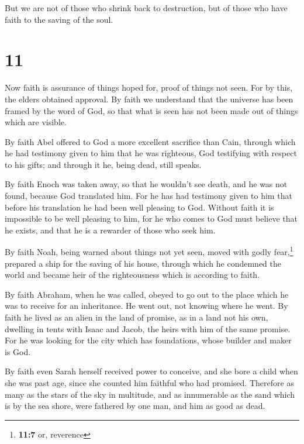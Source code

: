  But we are not of those who shrink back to destruction,
but of those who have faith to the saving of the soul.

\hypertarget{section-10}{%
\section{11}\label{section-10}}

 Now faith is assurance of things hoped for, proof of
things not seen.  For by this, the elders obtained
approval.  By faith we understand that the universe has
been framed by the word of God, so that what is seen has not been made
out of things which are visible.

 By faith Abel offered to God a more excellent sacrifice
than Cain, through which he had testimony given to him that he was
righteous, God testifying with respect to his gifts; and through it he,
being dead, still speaks.

 By faith Enoch was taken away, so that he wouldn't see
death, and he was not found, because God translated him. For he has had
testimony given to him that before his translation he had been well
pleasing to God.  Without faith it is impossible to be
well pleasing to him, for he who comes to God must believe that he
exists, and that he is a rewarder of those who seek him.

 By faith Noah, being warned about things not yet seen,
moved with godly fear,\footnote{\textbf{11:7} or, reverence} prepared a
ship for the saving of his house, through which he condemned the world
and became heir of the righteousness which is according to faith.

 By faith Abraham, when he was called, obeyed to go out to
the place which he was to receive for an inheritance. He went out, not
knowing where he went.  By faith he lived as an alien in
the land of promise, as in a land not his own, dwelling in tents with
Isaac and Jacob, the heirs with him of the same promise. 
For he was looking for the city which has foundations, whose builder and
maker is God.

 By faith even Sarah herself received power to conceive,
and she bore a child when she was past age, since she counted him
faithful who had promised.  Therefore as many as the
stars of the sky in multitude, and as innumerable as the sand which is
by the sea shore, were fathered by one man, and him as good as dead.

